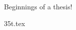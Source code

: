 \documentclass[a4paper,12pt]{article}
\begin{document}
Beginnings of a thesis!

{35t.tex}
\end{document}
